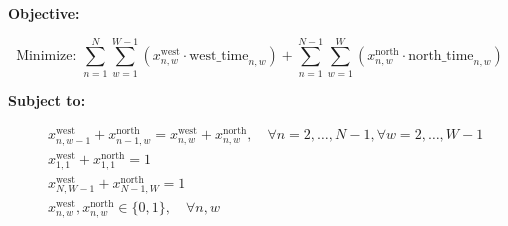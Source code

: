 \documentclass{article}
\begin{document}
\textbf{Objective:}

\[
\text{Minimize: } \sum_{n=1}^{N} \sum_{w=1}^{W-1} \left( x_{n,w}^{\text{west}} \cdot \text{west\_time}_{n,w} \right) + \sum_{n=1}^{N-1} \sum_{w=1}^{W} \left( x_{n,w}^{\text{north}} \cdot \text{north\_time}_{n,w} \right)
\]

\textbf{Subject to:}

\begin{align*}
& x_{n,w-1}^{\text{west}} + x_{n-1,w}^{\text{north}} = x_{n,w}^{\text{west}} + x_{n,w}^{\text{north}}, \quad \forall n = 2, \ldots, N-1, \forall w = 2, \ldots, W-1 \\
& x_{1,1}^{\text{west}} + x_{1,1}^{\text{north}} = 1 \\
& x_{N,W-1}^{\text{west}} + x_{N-1,W}^{\text{north}} = 1 \\
& x_{n,w}^{\text{west}}, x_{n,w}^{\text{north}} \in \{0, 1\}, \quad \forall n, w
\end{align*}
\end{document}
